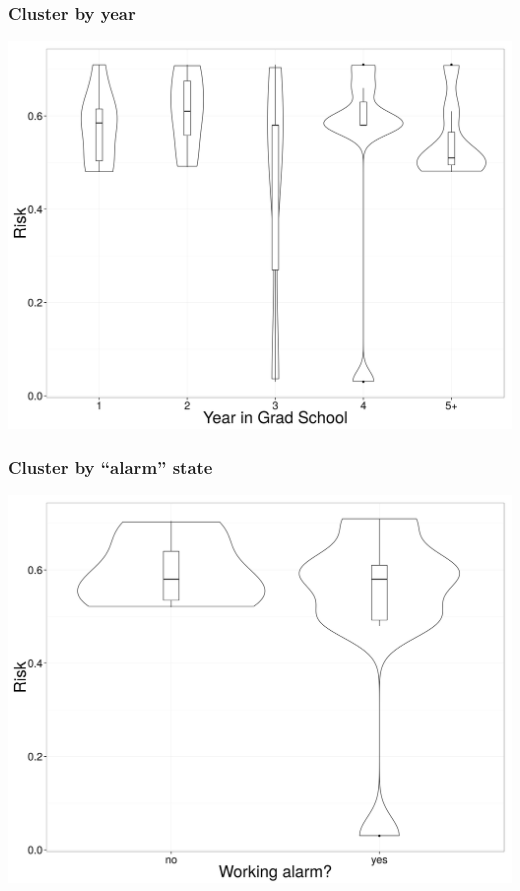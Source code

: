 \documentclass{beamer}
\begin{document}
\begin{frame}
  \frametitle{Cluster by year}
  \begin{center}
    \includegraphics[width=\textwidth,height=0.8\textheight,keepaspectratio=true]{clu_dif}
  \end{center}
\end{frame}

\begin{frame}
  \frametitle{Cluster by ``alarm'' state}
  \begin{center}
    \includegraphics[width=\textwidth,height=0.8\textheight,keepaspectratio=true]{clu_alm}
  \end{center}
\end{frame}
\end{document}

